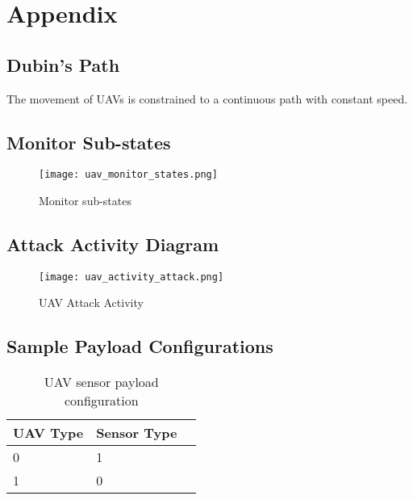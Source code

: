 \chapter{Appendix}


\section{Dubin's Path} \label{sec:dubin}
The movement of UAVs is constrained to a continuous path with constant speed.


\section{Monitor Sub-states}
\label{sec:monitorSubStates}
\begin{figure}[h]
	\centering
	\texttt{[image: uav\_monitor\_states.png]}
	\caption{Monitor sub-states}
	\label{fig:monitor}
\end{figure}

\section{Attack Activity Diagram}
\label{sec:attackActivity}
\begin{figure}[h]
	\centering
	\texttt{[image: uav\_activity\_attack.png]}
	\caption{UAV Attack Activity}
	\label{fig:uavAttackActivity}
\end{figure}


\section{Sample Payload Configurations}
\label{sec:pyldConfigs}
\begin{table}[h]
	\caption{UAV sensor payload configuration}
	\centering
	\label{tab:uavSensorMap}
	\begin{tabular}{|p{1cm}|p{1cm}|p{1cm}|}
		\hline
		UAV Type & Sensor Type\\ \hline
		0 & 1 \\
		1 & 0 \\
		\hline
	\end{tabular}
\end{table}


